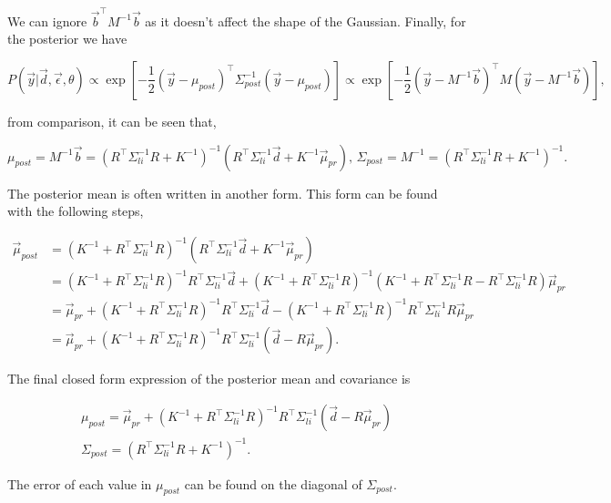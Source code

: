\noindent We can ignore $\vec b^\top M^{-1} \vec b$ as it doesn't affect the shape of the Gaussian. Finally, for the posterior we have

$$
P(\vec{y}|\vec{d},\vec\epsilon, \theta) \propto \exp \left[ -\frac{1}{2}(\vec y - \mu_{post})^{\top} \Sigma^{-1}_{post} (\vec y - \mu_{post}) \right] \propto \exp \left[ -\frac{1}{2} (\vec y - M^{-1}\vec b)^\top M (\vec y - M^{-1} \vec b)\right],
$$

\noindent from comparison, it can be seen that,

\begin{equation}
\mu_{post} = M^{-1} \vec b = \left(R^\top \Sigma_{li}^{-1} R + K^{-1}\right)^{-1} \left(R^{\top} \Sigma_{li}^{-1}\vec d + K^{-1} \vec \mu_{pr}\right), \, \Sigma_{post} = M^{-1} = \left(R^\top \Sigma_{li}^{-1} R + K^{-1}\right)^{-1}.
\end{equation}

The posterior mean is often written in another form. This form can be found with the following steps,

$$
\begin{aligned}
\vec{\mu}_{post} &= (K^{-1} + R^{\top} \Sigma_{li}^{-1} R)^{-1}(R^{\top} \Sigma_{li}^{-1} \vec{d} + K^{-1} \vec{\mu}_{pr}) \\
&= (K^{-1} + R^{\top} \Sigma_{li}^{-1} R)^{-1} R^{\top} \Sigma_{li}^{-1} \vec{d} + (K^{-1} + R^{\top} \Sigma_{li}^{-1} R)^{-1} (K^{-1} + R^{\top} \Sigma_{li}^{-1} R - R^{\top} \Sigma_{li}^{-1} R) \vec{\mu}_{pr} \\
&= \vec{\mu}_{pr} + (K^{-1} + R^{\top} \Sigma_{li}^{-1} R)^{-1} R^{\top} \Sigma_{li}^{-1} \vec{d} - (K^{-1} + R^{\top} \Sigma_{li}^{-1} R)^{-1} R^{\top} \Sigma_{li}^{-1} R \vec{\mu}_{pr} \\
&= \vec{\mu}_{pr} + (K^{-1} + R^{\top} \Sigma_{li}^{-1} R)^{-1} R^{\top} \Sigma_{li}^{-1} (\vec{d} - R \vec{\mu}_{pr}).
\end{aligned}
$$

\noindent The final closed form expression of the posterior mean and covariance is

\begin{gather}
\mu_{post}= \vec{\mu}_{pr} + (K^{-1} + R^{\top} \Sigma_{li}^{-1} R)^{-1} R^{\top} \Sigma_{li}^{-1} (\vec{d} - R \vec{\mu}_{pr})\\
\Sigma_{post} = \left(R^\top \Sigma_{li}^{-1} R + K^{-1}\right)^{-1}.
\end{gather}

\noindent The error of each value in $\mu_{post}$ can be found on the diagonal of $\Sigma_{post}$.
